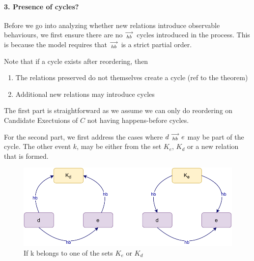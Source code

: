 
\paragraph{3. Presence of cycles?}
    Before we go into analyzing whether new relations introduce observable behaviours, we first ensure there are no $\stackrel{\longrightarrow}{_\textit{hb}}$ cycles introduced in the process. This is because the model requires that $\stackrel{\longrightarrow}{_{hb}}$ is a strict partial order. 
    
    Note that if a cycle exists after reordering, then 
    \begin{enumerate}
        \item The relations preserved do not themselves create a cycle (ref to the theorem)
        \item Additional new relations may introduce cycles
    \end{enumerate}

    The first part is straightforward as we assume we can only do reordering on Candidate Exectuions of $C$ not having happens-before cycles. 

    For the second part, we first address the cases where $d\stackrel{\longrightarrow}{_{hb}}e$ may be part of the cycle. The other event $k$, may be either from the set $K_e$, $K_d$ or a new relation that is formed\footnotemark.

    \begin{figure}[H]
        \centering
        \includegraphics[scale=0.7]{5.InstructionReordering/4.ValidReorderingCandidate/ProofParts/Part3/part3(b).pdf}
        \caption{If k belongs to one of the sets $K_e$ or $K_d$}
        \label{fig:my_label}
    \end{figure}

